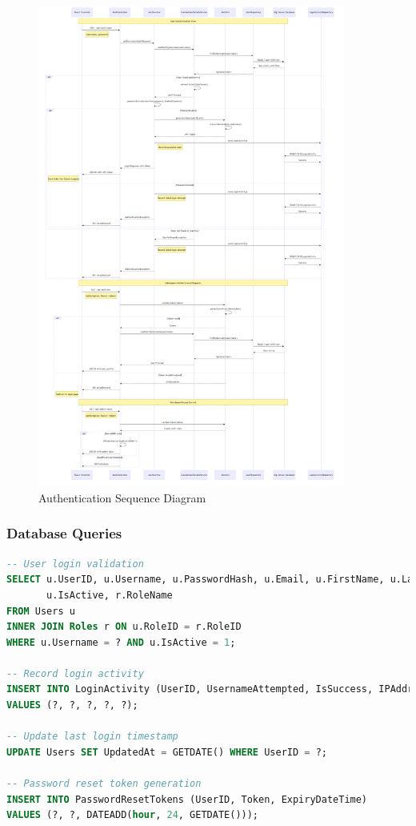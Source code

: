 \documentclass[12pt,a4paper]{article}
\begin{document}
\begin{figure}[H]
\centering
\includegraphics[width=0.9\textwidth]{diagrams/authentication_sequence.png}
\caption{Authentication Sequence Diagram}
\label{fig:auth-sequence}
\end{figure}

\subsubsection{Database Queries}

\begin{lstlisting}[language=SQL, caption=User Authentication Queries]
-- User login validation
SELECT u.UserID, u.Username, u.PasswordHash, u.Email, u.FirstName, u.LastName, 
       u.IsActive, r.RoleName
FROM Users u
INNER JOIN Roles r ON u.RoleID = r.RoleID
WHERE u.Username = ? AND u.IsActive = 1;

-- Record login activity
INSERT INTO LoginActivity (UserID, UsernameAttempted, IsSuccess, IPAddress, UserAgent)
VALUES (?, ?, ?, ?, ?);

-- Update last login timestamp
UPDATE Users SET UpdatedAt = GETDATE() WHERE UserID = ?;

-- Password reset token generation
INSERT INTO PasswordResetTokens (UserID, Token, ExpiryDateTime)
VALUES (?, ?, DATEADD(hour, 24, GETDATE()));
\end{lstlisting}
\end{document}
